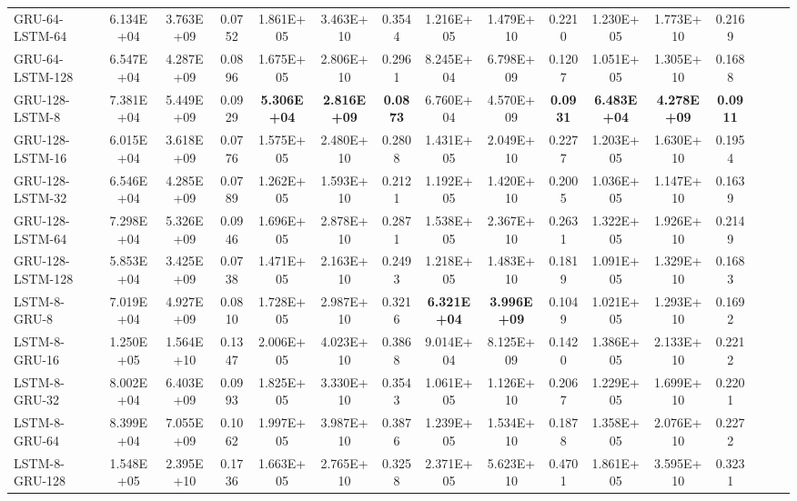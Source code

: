 \begin{landscape}
\begin{longtable}{|l|c|c|c|c|c|c|c|c|c|c|c|c|c|c|c|}
    GRU-64-LSTM-64 & 6.134E+04 & 3.763E+09 & 0.0752 & 1.861E+05 & 3.463E+10 & 0.3544 & 1.216E+05 & 1.479E+10 & 0.2210 & 1.230E+05 & 1.773E+10 & 0.2169 \\
    GRU-64-LSTM-128 & 6.547E+04 & 4.287E+09 & 0.0896 & 1.675E+05 & 2.806E+10 & 0.2961 & 8.245E+04 & 6.798E+09 & 0.1207 & 1.051E+05 & 1.305E+10 & 0.1688 \\
    GRU-128-LSTM-8 & 7.381E+04 & 5.449E+09 & 0.0929 & \cellcolor[rgb]{ .573,  .816,  .314}\textbf{5.306E+04} & \cellcolor[rgb]{ .573,  .816,  .314}\textbf{2.816E+09} & \cellcolor[rgb]{ .573,  .816,  .314}\textbf{0.0873} & 6.760E+04 & 4.570E+09 & \cellcolor[rgb]{ .573,  .816,  .314}\textbf{0.0931} & \cellcolor[rgb]{ .573,  .816,  .314}\textbf{6.483E+04} & \cellcolor[rgb]{ .573,  .816,  .314}\textbf{4.278E+09} & \cellcolor[rgb]{ .573,  .816,  .314}\textbf{0.0911} \\
    GRU-128-LSTM-16 & 6.015E+04 & 3.618E+09 & 0.0776 & 1.575E+05 & 2.480E+10 & 0.2808 & 1.431E+05 & 2.049E+10 & 0.2277 & 1.203E+05 & 1.630E+10 & 0.1954 \\
    GRU-128-LSTM-32 & 6.546E+04 & 4.285E+09 & 0.0789 & 1.262E+05 & 1.593E+10 & 0.2121 & 1.192E+05 & 1.420E+10 & 0.2005 & 1.036E+05 & 1.147E+10 & 0.1639 \\
    GRU-128-LSTM-64 & 7.298E+04 & 5.326E+09 & 0.0946 & 1.696E+05 & 2.878E+10 & 0.2871 & 1.538E+05 & 2.367E+10 & 0.2631 & 1.322E+05 & 1.926E+10 & 0.2149 \\
    GRU-128-LSTM-128 & 5.853E+04 & 3.425E+09 & 0.0738 & 1.471E+05 & 2.163E+10 & 0.2493 & 1.218E+05 & 1.483E+10 & 0.1819 & 1.091E+05 & 1.329E+10 & 0.1683 \\
    \midrule
    LSTM-8-GRU-8 & 7.019E+04 & 4.927E+09 & 0.0810 & 1.728E+05 & 2.987E+10 & 0.3216 & \cellcolor[rgb]{ .573,  .816,  .314}\textbf{6.321E+04} & \cellcolor[rgb]{ .573,  .816,  .314}\textbf{3.996E+09} & 0.1049 & 1.021E+05 & 1.293E+10 & 0.1692 \\
    LSTM-8-GRU-16 & 1.250E+05 & 1.564E+10 & 0.1347 & 2.006E+05 & 4.023E+10 & 0.3868 & 9.014E+04 & 8.125E+09 & 0.1420 & 1.386E+05 & 2.133E+10 & 0.2212 \\
    LSTM-8-GRU-32 & 8.002E+04 & 6.403E+09 & 0.0993 & 1.825E+05 & 3.330E+10 & 0.3543 & 1.061E+05 & 1.126E+10 & 0.2067 & 1.229E+05 & 1.699E+10 & 0.2201 \\
    LSTM-8-GRU-64 & 8.399E+04 & 7.055E+09 & 0.1062 & 1.997E+05 & 3.987E+10 & 0.3876 & 1.239E+05 & 1.534E+10 & 0.1878 & 1.358E+05 & 2.076E+10 & 0.2272 \\
    LSTM-8-GRU-128 & 1.548E+05 & 2.395E+10 & 0.1736 & 1.663E+05 & 2.765E+10 & 0.3258 & 2.371E+05 & 5.623E+10 & 0.4701 & 1.861E+05 & 3.595E+10 & 0.3231 \\

\end{longtable}
\end{landscape}
